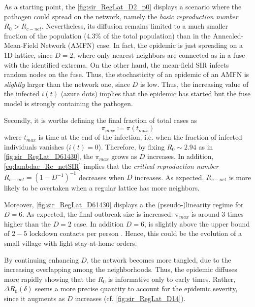 \documentclass[a4paper,10pt, oneside]{book} %
\theoremstyle{definition}
\begin{document}
As a starting point, the \autoref{fig:sir_RegLat_D2_p0} displays a scenario where the pathogen could spread on the network, namely the \textit{basic reproduction number} $R_0 > R_{c-net}$. Nevertheless, its diffusion remains limited to a much smaller fraction of the population ($4.3 \%$ of the total population) than in the Annealed-Mean-Field Network (AMFN) case. In fact, the epidemic is just spreading on a 1D lattice, since $ D = 2$, where only nearest neighbors are connected as in a fuse with the identified extrema. On the other hand, the mean-field SIR infects random nodes on the fuse. Thus, the stochasticity of an epidemic of an AMFN is \textit{slightly}  larger than the network one, since $ D$ is low. Thus, the increasing value of the infected $i(t)$ (azure dots) implies that the epidemic has started but the fuse model is strongly containing the pathogen. 

Secondly, it is worths defining the final fraction of total cases as
\begin{equation}
	\pi_{max} := \pi(t_{max})
	\label{eq:def_pmax}
\end{equation}
where $ t_{max}$ is time at the end of the infection, i.e. when the fraction of infected individuals vanishes ($i(t) = 0$).
Therefore, by fixing $R_0 \sim 2.94$ as in \autoref{fig:sir_RegLat_D61430}, the $ \pi_{max}$ grows as $D$ increases. In addition, \autoref{eq:lambdac_Rc_netSIR} implies that the
\textit{critical reproduction number} $R_{c-net} = (1-D^{-1})^{-1}$ decreases when $D$ increases. As expected, $R_{c-net}$ is more likely to be overtaken when a regular lattice has more neighbors.

Moreover, \autoref{fig:sir_RegLat_D61430} displays a the (pseudo-)linearity regime for $ D = 6$. As expected, the final outbreak size is increased: $ \pi_{max}$ is around $ 3$ times higher than the $ D=2$ case. In addition $D = 6$, is slightly above the upper bound of $2-5$ lockdown contacts per person \cite{Liu::2021_Review_SContactPattern}. Hence, this could be the evolution of a small village with light stay-at-home orders.


By continuing enhancing $ D$, the network becomes more tangled, due to the increasing overlapping among  the neighborhoods. Thus, the epidemic diffuses more rapidly showing that the $ R_0$ is informative only to early times. Rather, $\Delta R_0(\delta)$ seems a more precise quantity to account for the epidemic severity, since it augments as $D$ increases (cf. \autoref{fig:sir_RegLat_D14}).
\end{document}
